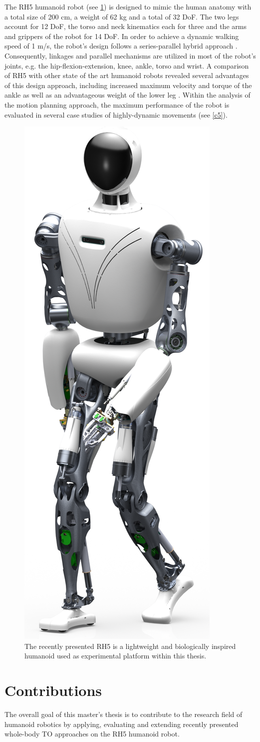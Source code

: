 The RH5 humanoid robot (see \cref{img:rh5_robot}) is designed to mimic the human anatomy with a total size of 200 cm, a weight of 62 kg and a total of 32 \gls{DoF}. The two legs account for 12 \gls{DoF}, the torso and neck kinematics each for three and the arms and grippers of the robot for 14 \gls{DoF}. In order to achieve a dynamic walking speed of 1 m/s, the robot's design follows a series-parallel hybrid approach \cite[Ch.2]{kumar2019modular}. Consequently, linkages and parallel mechanisms are utilized in most of the robot's joints, e.g. the hip-flexion-extension, knee, ankle, torso and wrist. A comparison of RH5 with other state of the art humanoid robots revealed several advantages of this design approach, including increased maximum velocity and torque of the ankle as well as an advantageous weight of the lower leg \cite{kumar2020survey}. Within the analysis of the motion planning approach, the maximum performance of the robot is evaluated in several case studies of highly-dynamic movements (see \cref{c5}).

\begin{figure}[h!]
\centering	
\includegraphics[width=.175\textwidth]{img/rh5_robot}
\caption[The lightweight and biologically inspired humanoid RH5]{The recently presented RH5 is a lightweight and biologically inspired humanoid used as experimental platform within this thesis.}
\label{img:rh5_robot}
\end{figure} 


\section{Contributions}\label{sec:IntroContributions}
The overall goal of this master's thesis is to contribute to the research field of humanoid robotics by applying, evaluating and extending recently presented whole-body \gls{TO} approaches on the RH5 humanoid robot. 

